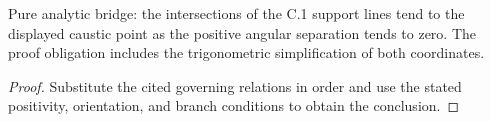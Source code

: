 \begin{lemma}
  \label{lem:physics:IPhO_2026_2_C_3:aux025}
  Pure analytic bridge: the intersections of the C.1 support lines tend to the displayed caustic point as the positive angular separation tends to zero. The proof obligation includes the trigonometric simplification of both coordinates.
\end{lemma}
\begin{proof}
  Substitute the cited governing relations in order and use the stated positivity, orientation, and branch conditions to obtain the conclusion.
\end{proof}
